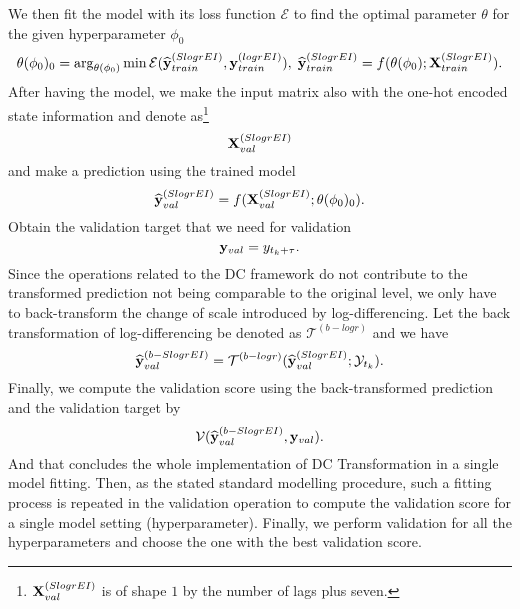 We then fit the model with its loss function $\mathcal{E}$ to find the optimal parameter $\theta$ for the given hyperparameter $\phi_0$
\begin{equation*}
    \theta(\phi_0)_0 = \arg_{\theta(\phi_0)} \min \mathcal{E}(\widehat{\mathbf{y}}^{(SlogrEI)}_{train}, \mathbf{y}^{(logrEI)}_{train}), \; \widehat{\mathbf{y}}^{(SlogrEI)}_{train} = f(\theta(\phi_0); \mathbf{X}^{(SlogrEI)}_{train}).
\end{equation*}
After having the model, we make the input matrix also with the one-hot encoded state information and denote as\footnote{$\mathbf{X}^{(SlogrEI)}_{val}$ is of shape $1$ by the number of lags plus seven.}
\begin{equation*}
    \mathbf{X}^{(SlogrEI)}_{val}
\end{equation*}
and make a prediction using the trained model
\begin{equation*}
    \widehat{\mathbf{y}}^{(SlogrEI)}_{val} = f(\mathbf{X}^{(SlogrEI)}_{val} ; \theta(\phi_0)_0).
\end{equation*}
Obtain the validation target that we need for validation
\begin{equation*}
    \mathbf{y}_{val} = y_{t_k + \tau}.
\end{equation*}
Since the operations related to the DC framework do not contribute to the transformed prediction not being comparable to the original level, we only have to back-transform the change of scale introduced by log-differencing. Let the back transformation of log-differencing be denoted as $\mathcal{T}^{(b-logr)}$ and we have
\begin{equation*}
    \widehat{\mathbf{y}}^{(b-SlogrEI)}_{val} = \mathcal{T}^{(b-logr)} (\widehat{\mathbf{y}}^{(SlogrEI)}_{val} ; \mathcal{Y}_{t_k}).
\end{equation*}
Finally, we compute the validation score using the back-transformed prediction and the validation target by
\begin{equation*}
    \mathcal{V} (\widehat{\mathbf{y}}^{(b-SlogrEI)}_{val}, \mathbf{y}_{val}).
\end{equation*}
And that concludes the whole implementation of DC Transformation in a single model fitting. Then, as the stated standard modelling procedure, such a fitting process is repeated in the validation operation to compute the validation score for a single model setting (hyperparameter). Finally, we perform validation for all the hyperparameters and choose the one with the best validation score.

